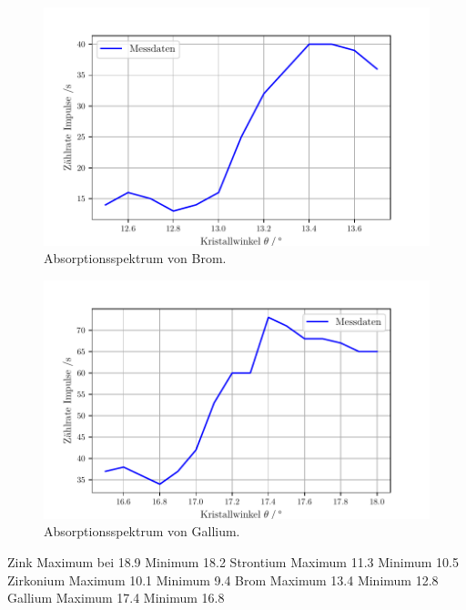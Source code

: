 \begin{figure}[H]
  \centering
  \includegraphics[width=\textwidth]{build/plot6.pdf}
  \caption{Absorptionsspektrum von Brom.}
  \label{fig:plot6}
\end{figure}

\begin{figure}[H]
  \centering
  \includegraphics[width=\textwidth]{build/plot7.pdf}
  \caption{Absorptionsspektrum von Gallium.}
  \label{fig:plot7}
\end{figure}

Zink Maximum bei 18.9 Minimum 18.2
Strontium Maximum 11.3 Minimum 10.5
Zirkonium Maximum 10.1 Minimum 9.4
Brom Maximum 13.4 Minimum 12.8
Gallium Maximum 17.4 Minimum 16.8
